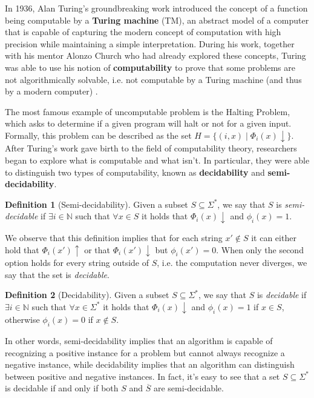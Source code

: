 \documentclass[12pt,a4paper]{article}
\theoremstyle{definition}
\newtheorem{definition}{Definition}
\newcommand{\N}{\mathbb{N}}                     %
\begin{document}
    In 1936, Alan Turing's groundbreaking work introduced the concept of a function being computable by a \textbf{Turing machine} (TM), an abstract model of a computer that is capable of capturing the modern concept of computation with high precision while maintaining a simple interpretation. During his work, together with his mentor Alonzo Church who had already explored these concepts, Turing was able to use his notion of \textbf{computability} to prove that some problems are not algorithmically solvable, i.e. not computable by a Turing machine (and thus by a modern computer) \cite{turing}.
    
    The most famous example of uncomputable problem is the Halting Problem, which asks to determine if a given program will halt or not for a given input. Formally, this problem can be described as the set $H = \{(i,x) \mid \Phi_i(x) \downarrow\}$. After Turing's work gave birth to the field of computability theory, researchers began to explore what is computable and what isn't. In particular, they were able to distinguish two types of computability, known as \textbf{decidability} and \textbf{semi-decidability}.
    
    \begin{definition}[Semi-decidability]
        Given a subset $S \subseteq \Sigma^*$, we say that $S$ is \textit{semi-decidable} if $\exists i \in \N$ such that $\forall x \in S$ it holds that $\Phi_i(x) \downarrow$ and $\phi_i(x) = 1$.
    \end{definition}
    
    We observe that this definition implies that for each string $x' \notin S$ it can either hold that $\Phi_i(x') \uparrow$ or that $\Phi_i(x') \downarrow$ but $\phi_i(x') = 0$. When only the second option holds for every string outside of $S$, i.e. the computation never diverges, we say that the set is \textit{decidable}.

    \begin{definition}[Decidability]
        Given a subset $S \subseteq \Sigma^*$, we say that $S$ is \textit{decidable} if $\exists i \in \N$ such that $\forall x \in \Sigma^*$ it holds that $\Phi_i(x) \downarrow$ and $\phi_i(x) = 1$ if $x \in S$, otherwise $\phi_i(x) = 0$ if $x \notin S$.
    \end{definition}
    
    In other words, semi-decidability implies that an algorithm is capable of recognizing a positive instance for a problem but cannot always recognize a negative instance, while decidability implies that an algorithm can distinguish between positive and negative instances. In fact, it's easy to see that a set $S \subseteq \Sigma^*$ is decidable if and only if both $S$ and $\overline{S}$ are semi-decidable.
\end{document}
